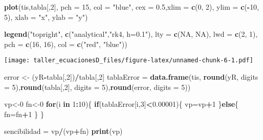 \documentclass[]{article}
\newenvironment{Shaded}{\begin{snugshade}}{\end{snugshade}}
\newcommand{\KeywordTok}[1]{\textcolor[rgb]{0.13,0.29,0.53}{\textbf{#1}}}
\newcommand{\DataTypeTok}[1]{\textcolor[rgb]{0.13,0.29,0.53}{#1}}
\newcommand{\DecValTok}[1]{\textcolor[rgb]{0.00,0.00,0.81}{#1}}
\newcommand{\FloatTok}[1]{\textcolor[rgb]{0.00,0.00,0.81}{#1}}
\newcommand{\StringTok}[1]{\textcolor[rgb]{0.31,0.60,0.02}{#1}}
\newcommand{\OtherTok}[1]{\textcolor[rgb]{0.56,0.35,0.01}{#1}}
\newcommand{\ControlFlowTok}[1]{\textcolor[rgb]{0.13,0.29,0.53}{\textbf{#1}}}
\newcommand{\OperatorTok}[1]{\textcolor[rgb]{0.81,0.36,0.00}{\textbf{#1}}}
\newcommand{\NormalTok}[1]{#1}
\begin{document}
\begin{Shaded}
\begin{Highlighting}[]
\KeywordTok{plot}\NormalTok{(tis,tabla[,}\DecValTok{2}\NormalTok{], }\DataTypeTok{pch =} \DecValTok{15}\NormalTok{, }\DataTypeTok{col =} \StringTok{"blue"}\NormalTok{, }\DataTypeTok{cex =} \FloatTok{0.5}\NormalTok{,}\DataTypeTok{xlim =} \KeywordTok{c}\NormalTok{(}\DecValTok{0}\NormalTok{, }\DecValTok{2}\NormalTok{), }\DataTypeTok{ylim =} \KeywordTok{c}\NormalTok{(}\OperatorTok{-}\DecValTok{10}\NormalTok{, }\DecValTok{5}\NormalTok{), }\DataTypeTok{xlab =} \StringTok{"x"}\NormalTok{, }\DataTypeTok{ylab =} \StringTok{"y"}\NormalTok{)}

\KeywordTok{legend}\NormalTok{(}\StringTok{"topright"}\NormalTok{,}
       \KeywordTok{c}\NormalTok{(}\StringTok{"analytical"}\NormalTok{,}\StringTok{"rk4, h=0.1"}\NormalTok{),}
       \DataTypeTok{lty =} \KeywordTok{c}\NormalTok{(}\OtherTok{NA}\NormalTok{, }\OtherTok{NA}\NormalTok{), }\DataTypeTok{lwd =} \KeywordTok{c}\NormalTok{(}\DecValTok{2}\NormalTok{, }\DecValTok{1}\NormalTok{),}
       \DataTypeTok{pch =} \KeywordTok{c}\NormalTok{(}\DecValTok{16}\NormalTok{, }\DecValTok{16}\NormalTok{),}
       \DataTypeTok{col =} \KeywordTok{c}\NormalTok{(}\StringTok{"red"}\NormalTok{, }\StringTok{"blue"}\NormalTok{))}
\end{Highlighting}
\end{Shaded}

\texttt{[image: taller\_ecuacionesD\_files/figure-latex/unnamed-chunk-6-1.pdf]}

\begin{Shaded}
\begin{Highlighting}[]
\NormalTok{error <-}\StringTok{ }\NormalTok{(yR}\OperatorTok{-}\NormalTok{tabla[,}\DecValTok{2}\NormalTok{])}\OperatorTok{/}\NormalTok{tabla[,}\DecValTok{2}\NormalTok{]}
\NormalTok{tablaError =}\StringTok{ }\KeywordTok{data.frame}\NormalTok{(tis, }\KeywordTok{round}\NormalTok{(yR, }\DataTypeTok{digits =} \DecValTok{5}\NormalTok{),}\KeywordTok{round}\NormalTok{(tabla[,}\DecValTok{2}\NormalTok{], }\DataTypeTok{digits =} \DecValTok{5}\NormalTok{),}\KeywordTok{round}\NormalTok{(error, }\DataTypeTok{digits =} \DecValTok{5}\NormalTok{))}


\NormalTok{vp<-}\DecValTok{0}
\NormalTok{fn<-}\DecValTok{0}
\ControlFlowTok{for}\NormalTok{(i }\ControlFlowTok{in} \DecValTok{1}\OperatorTok{:}\DecValTok{10}\NormalTok{)\{}
  \ControlFlowTok{if}\NormalTok{(tablaError[i,}\DecValTok{3}\NormalTok{]}\OperatorTok{<}\FloatTok{0.00001}\NormalTok{)\{}
\NormalTok{    vp=vp}\OperatorTok{+}\DecValTok{1}
\NormalTok{  \}}\ControlFlowTok{else}\NormalTok{\{}
\NormalTok{    fn=fn}\OperatorTok{+}\DecValTok{1}
\NormalTok{  \}}
\NormalTok{\}}

\NormalTok{sencibilidad =}\StringTok{ }\NormalTok{vp}\OperatorTok{/}\NormalTok{(vp}\OperatorTok{+}\NormalTok{fn)}
\KeywordTok{print}\NormalTok{(vp)}
\end{Highlighting}
\end{Shaded}
\end{document}
